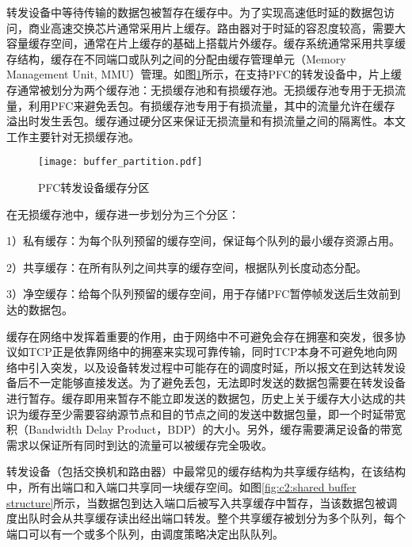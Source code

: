\label{c2:buffer partition in pfc-enabled device}

转发设备中等待传输的数据包被暂存在缓存中。为了实现高速低时延的数据包访问，商业高速交换芯片通常采用片上缓存\cite{SIGCOMM16RDMA,SIGCOMM15Jupiter,BroadcomSmartBuffer,ExtremeBuffer,BroadcomTrident3,BroadcomTomahawk4,CiscoNexus9300Buffer,Arista7050X3}。路由器对于时延的容忍度较高，需要大容量缓存空间，通常在片上缓存的基础上搭载片外缓存\cite{CiscoNcs5500,BCM88480}。缓存系统通常采用共享缓存结构，缓存在不同端口或队列之间的分配由缓存管理单元（Memory Management Unit, MMU）管理。如图\ref{fig:c2:buffer partition}所示，在支持PFC的转发设备中，片上缓存通常被划分为两个缓存池：无损缓存池和有损缓存池\cite{CiscoNexus9300Buffer,BCM88800TM,MellanoxRoCEConfig}。无损缓存池专用于无损流量，利用PFC来避免丢包。有损缓存池专用于有损流量，其中的流量允许在缓存溢出时发生丢包。缓存通过硬分区来保证无损流量和有损流量之间的隔离性。本文工作主要针对无损缓存池。

\begin{figure}[H]
  \centering
  \texttt{[image: buffer\_partition.pdf]}
  \caption{PFC转发设备缓存分区}
  \label{fig:c2:buffer partition}
\end{figure}

在无损缓存池中，缓存进一步划分为三个分区：

1）私有缓存：为每个队列预留的缓存空间，保证每个队列的最小缓存资源占用。

2）共享缓存：在所有队列之间共享的缓存空间，根据队列长度动态分配。

3）净空缓存：给每个队列预留的缓存空间，用于存储PFC暂停帧发送后生效前到达的数据包。



缓存在网络中发挥着重要的作用，由于网络中不可避免会存在拥塞和突发，很多协议如TCP正是依靠网络中的拥塞来实现可靠传输，同时TCP本身不可避免地向网络中引入突发，以及设备转发过程中可能存在的调度时延，所以报文在到达转发设备后不一定能够直接发送。为了避免丢包，无法即时发送的数据包需要在转发设备进行暂存。缓存即用来暂存不能立即发送的数据包，历史上关于缓存大小达成的共识为缓存至少需要容纳源节点和目的节点之间的发送中数据包量，即一个时延带宽积（Bandwidth Delay Product，BDP）的大小。另外，缓存需要满足设备的带宽需求以保证所有同时到达的流量可以被缓存完全吸收。


转发设备（包括交换机和路由器）中最常见的缓存结构为共享缓存结构，在该结构中，所有出端口和入端口共享同一块缓存空间\cite{9776493,SIGCOMM10DCTCP,cummings2010sharedmemory,broadcom2012smartbuffer}。如图\ref{fig:c2:shared buffer structure}所示，当数据包到达入端口后被写入共享缓存中暂存，当该数据包被调度出队时会从共享缓存读出经出端口转发。整个共享缓存被划分为多个队列，每个端口可以有一个或多个队列，由调度策略决定出队队列。


